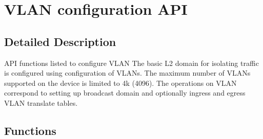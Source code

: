 \hypertarget{group__VLAN}{\section{V\+L\+A\+N configuration A\+P\+I}
\label{group__VLAN}
}


\subsection{Detailed Description}
A\+P\+I functions listed to configure V\+L\+A\+N The basic L2 domain for isolating traffic is configured using configuration of V\+L\+A\+Ns. The maximum number of V\+L\+A\+Ns supported on the device is limited to 4k (4096). The operations on V\+L\+A\+N correspond to setting up broadcast domain and optionally ingress and egress V\+L\+A\+N translate tables. \subsection*{Functions}
